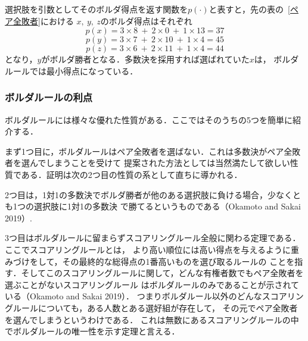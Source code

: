 \documentclass[dvipdfmx]{jsarticle}
\begin{document}
選択肢を引数としてそのボルダ得点を返す関数を$p(\cdot)$と表すと，先の表の~\ref{ペア全敗者}における
$x,\ y,\ z$のボルダ得点はそれぞれ
\begin{equation*}
  p(x) = 3 \times 8 \ + \ 2 \times 0 \ + \ 1 \times 13 = 37
\end{equation*}
\begin{equation*}
  p(y) = 3 \times 7 \ + \ 2 \times 10 \ + \ 1 \times 4 = 45
\end{equation*}
\begin{equation*}
  p(z) = 3 \times 6 \ + \ 2 \times 11 \ + \ 1 \times 4 = 44
\end{equation*}
となり，$y$がボルダ勝者となる．多数決を採用すれば選ばれていた$x$は，
ボルダルールでは最小得点になっている．

\subsubsection{ボルダルールの利点}\label{ボルダルールの利点}
ボルダルールには様々な優れた性質がある．ここではそのうちの5つを簡単に紹介する．

まず1つ目に，ボルダルールはペア全敗者を選ばない．これは多数決がペア全敗者を選んでしまうことを受けて
提案された方法としては当然満たして欲しい性質である．証明は次の2つ目の性質の系として直ちに導かれる．

2つ目は，1対1の多数決でボルダ勝者が他のある選択肢に負ける場合，少なくとも1つの選択肢に1対1の多数決
で勝てるというものである（Okamoto and Sakai 2019）.

3つ目はボルダルールに留まらずスコアリングルール全般に関わる定理である．ここでスコアリングルールとは，
より高い順位には高い得点を与えるように重みづけをして，その最終的な総得点の1番高いものを選び取るルールの
ことを指す．そしてこのスコアリングルールに関して，どんな有権者数でもペア全敗者を選ぶことがないスコアリングルール
はボルダルールのみであることが示されている（Okamoto and Sakai 2019）．
つまりボルダルール以外のどんなスコアリングルールについても，ある人数とある選好組が存在して，
その元でペア全敗者を選んでしまうというわけである．
これは無数にあるスコアリングルールの中でボルダルールの唯一性を示す定理と言える．
\end{document}
